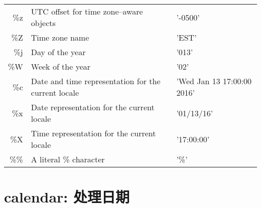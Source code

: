 \begin{table}
\begin{tabular}{rll}
        \%z    & UTC offset for time zone–aware objects              & '-0500'                    \\
        \%Z    & Time zone name                                      & 'EST'                      \\
        \%j    & Day of the year                                     & '013'                      \\
        \%W    & Week of the year                                    & '02'                       \\
        \%c    & Date and time representation for the current locale & 'Wed Jan 13 17:00:00 2016' \\
        \%x    & Date representation for the current locale          & '01/13/16'                 \\
        \%X    & Time representation for the current locale          & '17:00:00'                 \\
        \%\%   & A literal \% character                              & '\%'                       \\
        \hline
    \end{tabular}

\end{table}
\section{calendar: 处理日期}